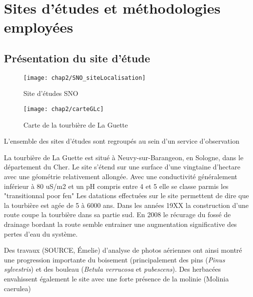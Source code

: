 
\chapter{Sites d'études et méthodologies employées}

\minitoc

\newpage

\section{Présentation du site d'étude}

\begin{figure}
\centering
\texttt{[image: chap2/SNO\_siteLocalisation]}
\caption{Site d'études SNO}
\label{fig:carte_europe}
\end{figure}

\begin{figure}
\texttt{[image: chap2/carteGLc]}
\caption{Carte de la tourbière de La Guette}
\label{fig:carte_LG}
\end{figure}


L'ensemble des sites d'études sont regroupés au sein d'un service d'observation


La tourbière de La Guette est situé à Neuvy-sur-Barangeon, en Sologne, dans le département du Cher.
Le site s'étend sur une surface d'une vingtaine d'hectare avec une géométrie relativement allongée.
Avec une conductivité généralement inférieur à 80 uS/m2 et un pH compris entre 4 et 5 elle se classe parmis les "transitionnal poor fen"
Les datations effectuées sur le site permettent de dire que la tourbière est agée de 5 à 6000 ans.
Dans les années 19XX la construction d'une route coupe la tourbière dans sa partie sud.
En 2008 le récurage du fossé de drainage bordant la route semble entrainer une augmentation significative des pertes d'eau du système.

Des travaux (SOURCE, Émelie) d'analyse de photos aériennes ont ainsi montré une progression importante du boisement (principalement des pins (\textit{Pinus sylvestris}) et des bouleau (\textit{Betula verrucosa} et \textit{pubescens}). Des herbacées envahissent également le site avec une forte présence de la molinie (Molinia caerulea)

